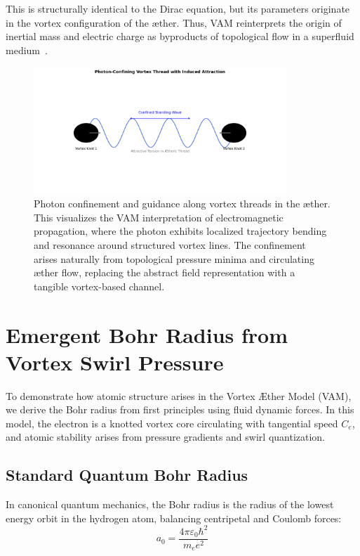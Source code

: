 This is structurally identical to the Dirac equation, but its parameters originate in the vortex configuration of the æther. Thus, VAM reinterprets the origin of inertial mass and electric charge as byproducts of topological flow in a superfluid medium~\cite{Barcelo2011, volovik2003}.

\begin{figure}[H]
    \centering
    \includegraphics[width=0.85\textwidth]{images/08-Photon-ConfiningVortexThreadGravitation}
    \caption{Photon confinement and guidance along vortex threads in the æther. This visualizes the VAM interpretation of electromagnetic propagation, where the photon exhibits localized trajectory bending and resonance around structured vortex lines. The confinement arises naturally from topological pressure minima and circulating æther flow, replacing the abstract field representation with a tangible vortex-based channel.}
    \label{fig:photon_confine}
\end{figure}

\section{Emergent Bohr Radius from Vortex Swirl Pressure}

To demonstrate how atomic structure arises in the Vortex \AE ther Model (VAM), we derive the Bohr radius from first principles using fluid dynamic forces. In this model, the electron is a knotted vortex core circulating with tangential speed $C_e$, and atomic stability arises from pressure gradients and swirl quantization.

\subsection*{Standard Quantum Bohr Radius}

In canonical quantum mechanics, the Bohr radius is the radius of the lowest energy orbit in the hydrogen atom, balancing centripetal and Coulomb forces:
\begin{equation}
    a_0 = \frac{4\pi \varepsilon_0 \hbar^2}{m_e e^2}
\end{equation}

